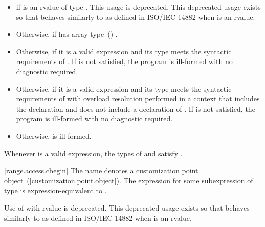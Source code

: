 \begin{itemize}
\item
   if  is an rvalue of
  type . This usage is deprecated.
  \enternote This deprecated usage exists so that
   behaves similarly to 
  as defined in ISO/IEC 14882 when  is an rvalue. \exitnote

\item
  Otherwise,  if  has array
  type~() .

\item
  Otherwise,  if it is a valid expression and its type  meets the
  syntactic requirements of
  . If
   is not satisfied, the program is ill-formed with
  no diagnostic required.

\item
  Otherwise,  if it is a valid expression and its type  meets the
  syntactic requirements of
   with overload
  resolution performed in a context that includes the declaration
   and does not include
  a declaration of . If  is not
  satisfied, the program is ill-formed with no diagnostic required.

\item
  Otherwise,  is ill-formed.
\end{itemize}

\pnum
\enternote Whenever  is a valid expression, the
types of  and  satisfy
. \exitnote

[range.access.cbegin]{}
\pnum
The name  denotes a customization point
object~(\ref{customization.point.object}). The expression
 for some subexpression  of type 
is expression-equivalent to .

\pnum
Use of  with rvalue  is deprecated.
\enternote This deprecated usage exists so that 
behaves similarly to  as defined in ISO/IEC 14882 when
 is an rvalue. \exitnote

